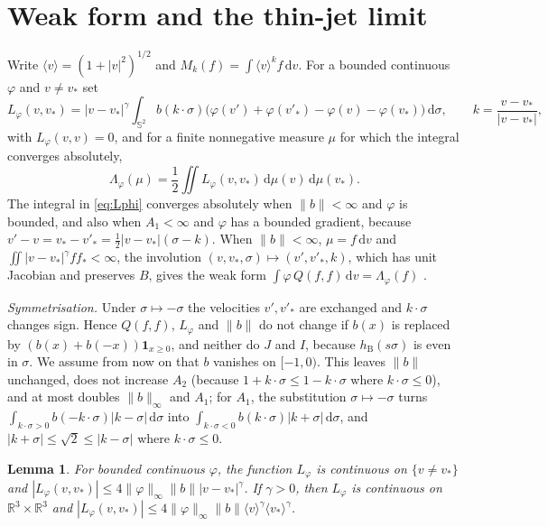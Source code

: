 \documentclass[11pt]{amsart}
\newtheorem{lemma}[theorem]{Lemma}
\theoremstyle{definition}
\newcommand{\RR}{\mathbb{R}}
\newcommand{\Sph}{\mathbb{S}}
\newcommand{\dd}{\,\mathrm{d}}
\newcommand{\jb}[1]{\langle #1\rangle}
\newcommand{\nb}{\|b\|}
\newcommand{\nbi}{\|b\|_\infty}
\newcommand{\hB}{h_{\mathrm B}}
\begin{document}
\section{Weak form and the thin-jet limit}\label{sec:weak}

Write $\jb{v}=(1+|v|^2)^{1/2}$ and $M_k(f)=\int\jb{v}^kf\dd v$. For a bounded continuous $\varphi$ and $v\ne v_*$ set
\begin{equation}\label{eq:Lphi}
L_\varphi(v,v_*)=|v-v_*|^\gamma\int_{\Sph^2}b(k\cdot\sigma)\big(\varphi(v')+\varphi(v'_*)-\varphi(v)-\varphi(v_*)\big)\dd\sigma,\qquad k=\frac{v-v_*}{|v-v_*|},
\end{equation}
with $L_\varphi(v,v)=0$, and for a finite nonnegative measure $\mu$ for which the integral converges absolutely,
\begin{equation}\label{eq:Lambda}
\Lambda_\varphi(\mu)=\frac12\iint L_\varphi(v,v_*)\dd\mu(v)\dd\mu(v_*).
\end{equation}
The integral in \eqref{eq:Lphi} converges absolutely when $\nb<\infty$ and $\varphi$ is bounded, and also when $A_1<\infty$ and $\varphi$ has a bounded gradient, because $v'-v=v_*-v'_*=\frac12|v-v_*|(\sigma-k)$. When $\nb<\infty$, $\mu=f\dd v$ and $\iint|v-v_*|^\gamma f f_*<\infty$, the involution $(v,v_*,\sigma)\mapsto(v',v'_*,k)$, which has unit Jacobian and preserves $B$, gives the weak form $\int\varphi\,Q(f,f)\dd v=\Lambda_\varphi(f)$ \cite[Chap.~1]{Vil02}.

\emph{Symmetrisation.} Under $\sigma\mapsto-\sigma$ the velocities $v',v'_*$ are exchanged and $k\cdot\sigma$ changes sign. Hence $Q(f,f)$, $L_\varphi$ and $\nb$ do not change if $b(x)$ is replaced by $(b(x)+b(-x))\mathbf 1_{x\ge0}$, and neither do $J$ and $I$, because $\hB(s\sigma)$ is even in $\sigma$. We assume from now on that $b$ vanishes on $[-1,0)$. This leaves $\nb$ unchanged, does not increase $A_2$ (because $1+k\cdot\sigma\le1-k\cdot\sigma$ where $k\cdot\sigma\le0$), and at most doubles $\nbi$ and $A_1$; for $A_1$, the substitution $\sigma\mapsto-\sigma$ turns $\int_{k\cdot\sigma>0}b(-k\cdot\sigma)|k-\sigma|\dd\sigma$ into $\int_{k\cdot\sigma<0}b(k\cdot\sigma)|k+\sigma|\dd\sigma$, and $|k+\sigma|\le\sqrt2\le|k-\sigma|$ where $k\cdot\sigma\le0$.

\begin{lemma}\label{lem:cont}
For bounded continuous $\varphi$, the function $L_\varphi$ is continuous on $\{v\ne v_*\}$ and $|L_\varphi(v,v_*)|\le4\|\varphi\|_\infty\nb|v-v_*|^\gamma$. If $\gamma>0$, then $L_\varphi$ is continuous on $\RR^3\times\RR^3$ and $|L_\varphi(v,v_*)|\le4\|\varphi\|_\infty\nb\jb{v}^\gamma\jb{v_*}^\gamma$.
\end{lemma}
\end{document}
